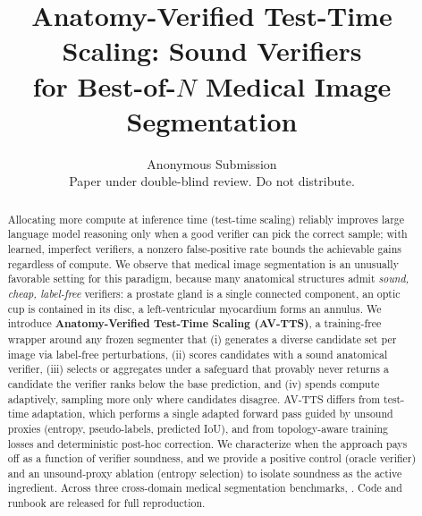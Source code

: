 \documentclass[10pt]{article}
\title{\vspace{-2.5em}\textbf{Anatomy-Verified Test-Time Scaling: Sound Verifiers\\ for Best-of-$N$ Medical Image Segmentation}}
\author{Anonymous Submission\\ \small Paper under double-blind review. Do not distribute.}
\date{}
\begin{document}
\maketitle

\begin{abstract}
Allocating more compute at inference time (test-time scaling) reliably improves large language model reasoning only when a good verifier can pick the correct sample; with learned, imperfect verifiers, a nonzero false-positive rate bounds the achievable gains regardless of compute. We observe that medical image segmentation is an unusually favorable setting for this paradigm, because many anatomical structures admit \emph{sound, cheap, label-free} verifiers: a prostate gland is a single connected component, an optic cup is contained in its disc, a left-ventricular myocardium forms an annulus. We introduce \textbf{Anatomy-Verified Test-Time Scaling (AV-TTS)}, a training-free wrapper around any frozen segmenter that (i) generates a diverse candidate set per image via label-free perturbations, (ii) scores candidates with a sound anatomical verifier, (iii) selects or aggregates under a safeguard that provably never returns a candidate the verifier ranks below the base prediction, and (iv) spends compute adaptively, sampling more only where candidates disagree. AV-TTS differs from test-time adaptation, which performs a single adapted forward pass guided by unsound proxies (entropy, pseudo-labels, predicted IoU), and from topology-aware training losses and deterministic post-hoc correction. We characterize when the approach pays off as a function of verifier soundness, and we provide a positive control (oracle verifier) and an unsound-proxy ablation (entropy selection) to isolate soundness as the active ingredient. Across three cross-domain medical segmentation benchmarks, . Code and runbook are released for full reproduction.
\end{abstract}
\end{document}
